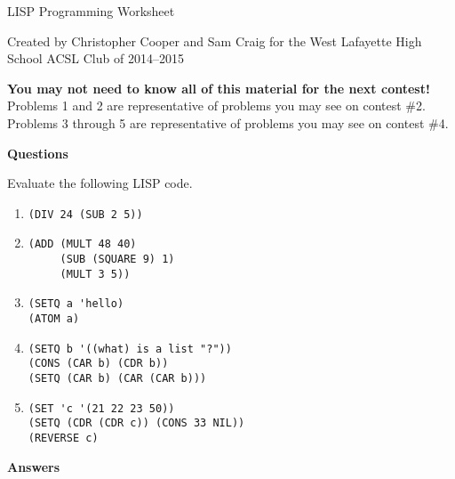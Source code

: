 \documentclass[12pt,letterpaper]{article}
\begin{document}
\begin{center}
  LISP Programming Worksheet

  Created by Christopher Cooper and Sam Craig for the West Lafayette High School ACSL Club of 2014--2015
\end{center}

\textbf{You may not need to know all of this material for the next contest!}
Problems 1 and 2 are representative of problems you may see on contest \#2.
Problems 3 through 5 are representative of problems you may see on contest \#4.

\bigskip
\noindent \textbf{Questions}

Evaluate the following LISP code.

\begin{enumerate}

\item
\begin{verbatim}
(DIV 24 (SUB 2 5))
\end{verbatim}

\item
\begin{verbatim}
(ADD (MULT 48 40)
     (SUB (SQUARE 9) 1)
     (MULT 3 5))
\end{verbatim}

\item
\begin{verbatim}
(SETQ a 'hello)
(ATOM a)
\end{verbatim}

\item
\begin{verbatim}
(SETQ b '((what) is a list "?"))
(CONS (CAR b) (CDR b))
(SETQ (CAR b) (CAR (CAR b)))
\end{verbatim}

\item
\begin{verbatim}
(SET 'c '(21 22 23 50))
(SETQ (CDR (CDR c)) (CONS 33 NIL))
(REVERSE c)
\end{verbatim}

\end{enumerate}

\pagebreak

\noindent \textbf{Answers}
\end{document}
